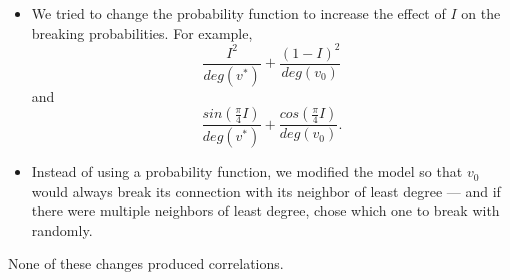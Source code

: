 \documentclass[a4paper,10pt]{article}
\begin{document}
\begin{itemize}

 \item We tried to change the probability function to increase the effect of $I$ on the breaking probabilities. For example,
 \begin{equation}
  \frac{I^2}{deg(v^*)} + \frac{(1 - I)^2}{deg(v_0)}
 \end{equation}
and
 \begin{equation}
  \frac{sin(\frac{\pi}{4}I)}{deg(v^*)} + \frac{cos(\frac{\pi}{4}I)}{deg(v_0)}.
 \end{equation}

 \item Instead of using a probability function, we modified the model so that $v_0$ would always break its connection with its neighbor of least degree --- and if there were multiple neighbors of least degree, chose which one to break with randomly. 

\end{itemize}
 None of these changes produced correlations.
\end{document}
